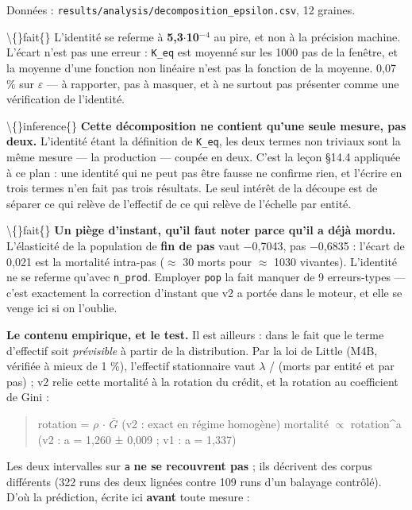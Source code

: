 \documentclass[11pt,a4paper]{article}
\newcommand{\code}[1]{\texttt{#1}}
\begin{document}
Données : \code{results/analysis/decomposition\_epsilon.csv}, 12 graines.

\textbackslash\{\}fait\{\} L'identité se referme à \textbf{5,3\ensuremath{\cdot}10\ensuremath{^-}\ensuremath{^{4}}} au pire, et non à la précision machine. L'écart n'est pas une erreur : \code{K\_eq} est moyenné sur les 1000 pas de la fenêtre, et la moyenne d'une fonction non linéaire n'est pas la fonction de la moyenne. 0,07 \% sur \ensuremath{\varepsilon} --- à rapporter, pas à masquer, et à ne surtout pas présenter comme une vérification de l'identité.

\textbackslash\{\}inference\{\} \textbf{Cette décomposition ne contient qu'une seule mesure, pas deux.} L'identité étant la définition de \code{K\_eq}, les deux termes non triviaux sont la même mesure --- la production --- coupée en deux. C'est la leçon §14.4 appliquée à ce plan : une identité qui ne peut pas être fausse ne confirme rien, et l'écrire en trois termes n'en fait pas trois résultats. Le seul intérêt de la découpe est de séparer ce qui relève de l'effectif de ce qui relève de l'échelle par entité.

\textbackslash\{\}fait\{\} \textbf{Un piège d'instant, qu'il faut noter parce qu'il a déjà mordu.} L'élasticité de la population de \textbf{fin de pas} vaut \ensuremath{-}0,7043, pas \ensuremath{-}0,6835 : l'écart de 0,021 est la mortalité intra-pas (\ensuremath{\approx} 30 morts pour \ensuremath{\approx} 1030 vivantes). L'identité ne se referme qu'avec \code{n\_prod}. Employer \code{pop} la fait manquer de 9 erreurs-types --- c'est exactement la correction d'instant que v2 a portée dans le moteur, et elle se venge ici si on l'oublie.

\textbf{Le contenu empirique, et le test.} Il est ailleurs : dans le fait que le terme d'effectif soit \emph{prévisible} à partir de la distribution. Par la loi de Little (M4B, vérifiée à mieux de 1 \%), l'effectif stationnaire vaut \ensuremath{\lambda} / (morts par entité et par pas) ; v2 relie cette mortalité à la rotation du crédit, et la rotation au coefficient de Gini :

\begin{quote}\ttfamily\footnotesize\obeylines
rotation = \ensuremath{\rho} \ensuremath{\cdot} \ensuremath{\bar{G}}        (v2 : exact en régime homogène)
mortalité \ensuremath{\propto} rotation\textasciicircum{}a  (v2 : a = 1,260 ± 0,009 ; v1 : a = 1,337)
\end{quote}

Les deux intervalles sur \code{a} \textbf{ne se recouvrent pas} ; ils décrivent des corpus différents (322 runs des deux lignées contre 109 runs d'un balayage contrôlé). D'où la prédiction, écrite ici \textbf{avant} toute mesure :
\end{document}
